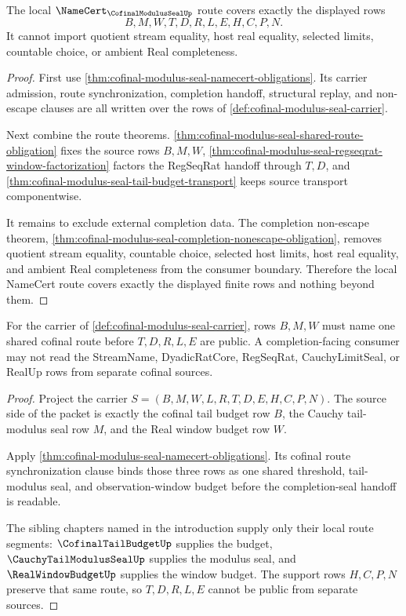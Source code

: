 \begin{theorem}
\label{thm:cofinal-modulus-seal-namecert-route-coverage}
The local $\NameCert_{\CofinalModulusSealUp}$ route covers exactly the displayed rows
$$
B,M,W,T,D,R,L,E,H,C,P,N.
$$
It cannot import quotient stream equality, host real equality, selected limits, countable choice, or ambient Real completeness.
\end{theorem}
\begin{proof}
First use \autoref{thm:cofinal-modulus-seal-namecert-obligations}. Its carrier admission, route synchronization, completion handoff, structural replay, and non-escape clauses are all written over the rows of \autoref{def:cofinal-modulus-seal-carrier}.

Next combine the route theorems. \autoref{thm:cofinal-modulus-seal-shared-route-obligation} fixes the source rows $B,M,W$, \autoref{thm:cofinal-modulus-seal-regseqrat-window-factorization} factors the RegSeqRat handoff through $T,D$, and \autoref{thm:cofinal-modulus-seal-tail-budget-transport} keeps source transport componentwise.

It remains to exclude external completion data. The completion non-escape theorem, \autoref{thm:cofinal-modulus-seal-completion-nonescape-obligation}, removes quotient stream equality, countable choice, selected host limits, host real equality, and ambient Real completeness from the consumer boundary. Therefore the local NameCert route covers exactly the displayed finite rows and nothing beyond them.
\end{proof}

\begin{theorem}
\label{thm:cofinal-modulus-seal-shared-route-obligation}
For the carrier of \autoref{def:cofinal-modulus-seal-carrier}, rows $B,M,W$ must name one shared cofinal route before $T,D,R,L,E$ are public. A completion-facing consumer may not read the StreamName, DyadicRatCore, RegSeqRat, CauchyLimitSeal, or RealUp rows from separate cofinal sources.
\end{theorem}
\begin{proof}
Project the carrier $S=(B,M,W,L,R,T,D,E,H,C,P,N)$. The source side of the packet is exactly the cofinal tail budget row $B$, the Cauchy tail-modulus seal row $M$, and the Real window budget row $W$.

Apply \autoref{thm:cofinal-modulus-seal-namecert-obligations}. Its cofinal route synchronization clause binds those three rows as one shared threshold, tail-modulus seal, and observation-window budget before the completion-seal handoff is readable.

The sibling chapters named in the introduction supply only their local route segments: $\CofinalTailBudgetUp$ supplies the budget, $\CauchyTailModulusSealUp$ supplies the modulus seal, and $\RealWindowBudgetUp$ supplies the window budget. The support rows $H,C,P,N$ preserve that same route, so $T,D,R,L,E$ cannot be public from separate sources.
\end{proof}

